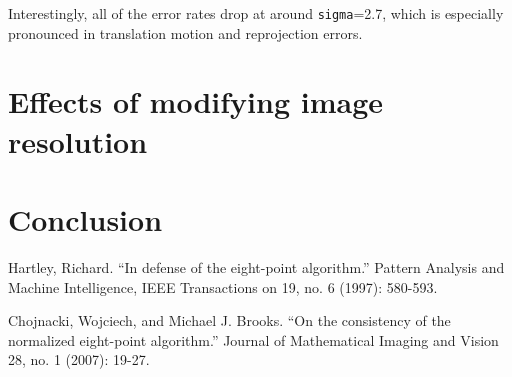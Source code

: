 \documentclass{article}
\begin{document}
Interestingly, all of the error rates drop at around \texttt{sigma}=2.7, which is especially pronounced in translation motion and reprojection errors.







\newpage
\section{Effects of modifying image resolution}

\newpage
\section{Conclusion}

\newpage


\newpage
\begin{thebibliography}{99}
	Hartley, Richard. ``In defense of the eight-point algorithm.'' Pattern Analysis and Machine Intelligence, IEEE Transactions on 19, no. 6 (1997): 580-593.

	Chojnacki, Wojciech, and Michael J. Brooks. ``On the consistency of the normalized eight-point algorithm.'' Journal of Mathematical Imaging and Vision 28, no. 1 (2007): 19-27.
\end{thebibliography}
\end{document}
